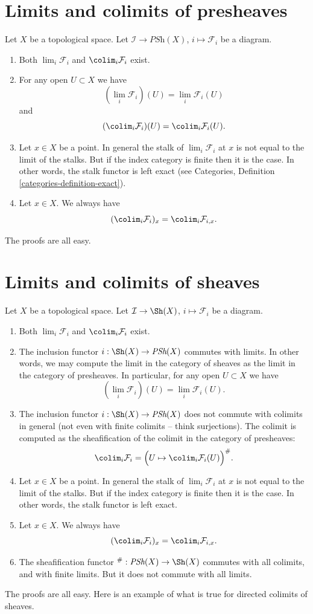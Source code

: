 \section{Limits and colimits of presheaves}
\label{sheaves-section-limits-presheaves}
Let $X$ be a topological space.
Let $\mathcal{I} \to \textit{PSh}(X)$, $i \mapsto \mathcal{F}_i$
be a diagram.
\begin{enumerate}
\item Both $\lim_i \mathcal{F}_i$ and $\colim_i \mathcal{F}_i$
exist.
\item For any open $U \subset X$ we have
$$
(\lim_i \mathcal{F}_i)(U) =
\lim_i \mathcal{F}_i(U)
$$
and
$$
(\colim_i \mathcal{F}_i)(U) =
\colim_i \mathcal{F}_i(U).
$$
\item Let $x \in X$ be a point. In general the stalk of
$\lim_i \mathcal{F}_i$ at $x$ is not equal to
the limit of the stalks. But if the index category is finite
then it is the case. In other words, the stalk functor is
left exact (see Categories, Definition \ref{categories-definition-exact}).
\item Let $x \in X$. We always have
$$
(\colim_i \mathcal{F}_i)_x =
\colim_i \mathcal{F}_{i, x}.
$$
\end{enumerate}
The proofs are all easy.

\section{Limits and colimits of sheaves}
\label{sheaves-section-limits-sheaves}
Let $X$ be a topological space.
Let $\mathcal{I} \to \Sh(X)$, $i \mapsto \mathcal{F}_i$
be a diagram.
\begin{enumerate}
\item Both $\lim_i \mathcal{F}_i$ and $\colim_i \mathcal{F}_i$
exist.
\item The inclusion functor $i : \Sh(X) \to \textit{PSh}(X)$
commutes with limits. In other words, we may compute the limit
in the category of sheaves as the limit in the category of
presheaves. In particular, for any open $U \subset X$ we have
$$
(\lim_i \mathcal{F}_i)(U) = \lim_i \mathcal{F}_i(U).
$$
\item The inclusion functor $i : \Sh(X) \to \textit{PSh}(X)$
does not commute with colimits in general (not even
with finite colimits -- think surjections). The colimit is
computed as the sheafification of the colimit in the
category of presheaves:
$$
\colim_i \mathcal{F}_i =
\Big(U \mapsto \colim_i \mathcal{F}_i(U)\Big)^\#.
$$
\item Let $x \in X$ be a point. In general the stalk of
$\lim_i \mathcal{F}_i$ at $x$ is not equal to
the limit of the stalks. But if the index category is finite
then it is the case. In other words, the stalk functor is
left exact.
\item Let $x \in X$. We always have
$$
(\colim_i \mathcal{F}_i)_x = \colim_i \mathcal{F}_{i, x}.
$$
\item The sheafification functor
${}^\# : \textit{PSh}(X) \to \Sh(X)$ commutes with all
colimits, and with finite limits. But it does not commute
with all limits.
\end{enumerate}
The proofs are all easy. Here is an example of what is true for directed
colimits of sheaves.

